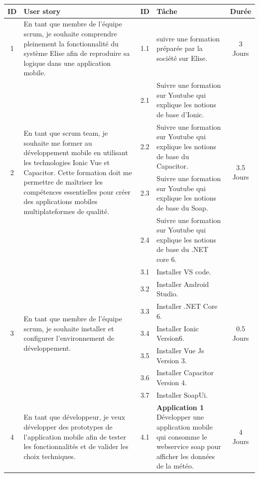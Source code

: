 \begin{adjustwidth}{-1cm}{}
    
    \begin{longtable}{|c|p{6cm}|c|p{6cm}|c|}
      \hline
      \textbf{ID} & \textbf{User story} & \textbf{ID}  & \textbf{Tâche} & \textbf{Durée} \\
      \hline

    1 & En tant que membre de l'équipe scrum, je
    souhaite comprendre pleinement la fonctionnalité du système Elise afin de reproduire sa logique dans une application mobile. &  1.1 &suivre une formation préparée par la société sur Elise.&3 Jours\\
    \cline{1-5}
    \multirow{4}{*}{2} & \multirow{4}{6cm}{En tant que scrum team, je souhaite me former au développement mobile en utilisant les technologies Ionic Vue et Capacitor. Cette formation doit me permettre de maîtriser les compétences essentielles pour créer des applications mobiles multiplateformes de qualité.}  &  2.1 &Suivre une formation sur Youtube qui explique les notions de base d'Ionic.&\multirow{4}{2cm}{3.5 Jours}\\
    \cline{3-4}
    &  &  2.2 &Suivre une formation sur Youtube qui explique les notions de base du Capacitor.&\\
    \cline{3-4}
    &  &  2.3 &Suivre une formation sur Youtube qui explique les notions de base du Soap.&\\
    \cline{3-4}
    &  &  2.4 &Suivre une formation sur Youtube qui explique les notions de base du .NET core 6.&\\
    \cline{1-5}
    \multirow{7}{*}{3} & \multirow{7}{6cm}{En tant que membre de l'équipe scrum, je souhaite installer et configurer l'environnement de développement.} &  3.1 &Installer VS code.&\multirow{7}{2cm}{0.5 Jours}\\
    \cline{3-4}
    &  &  3.2 &Installer Android Studio.&\\
    \cline{3-4}
    &  &  3.3 &Installer .NET Core 6.&\\
    \cline{3-4}
    &  &  3.4 &Installer Ionic Version6.&\\
    \cline{3-4}
    &  &  3.5 &Installer Vue Js Version 3.&\\
    \cline{3-4}
    &  &  3.6 &Installer Capacitor Version 4.&\\
    \cline{3-4}
    &  &  3.7 &Installer SoapUi.&\\
    \cline{1-5}
    \multirow{4}{*}{4} & \multirow{4}{6cm}{En tant que développeur, je veux développer des prototypes de l'application mobile afin de tester les fonctionnalités et de valider les choix techniques.} &  4.1 &\textbf{Application 1} Développer une application mobile qui consomme le webservice soap pour afficher les données de la météo.&\multirow{4}{2cm}{4 Jours}\\

\end{longtable}
\end{adjustwidth}
